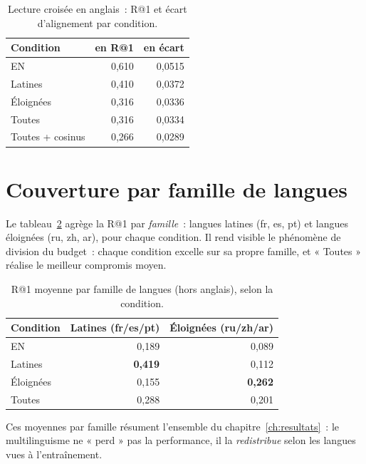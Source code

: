 \documentclass[12pt,a4paper,oneside]{report}
\theoremstyle{definition}
\theoremstyle{plain}
\begin{document}
\begin{table}[ht]
\centering
\caption{Lecture croisée en anglais~: R@1 et écart d'alignement par condition.}
\label{tab:cross}
\small
\begin{tabular}{@{}lrr@{}}
\toprule
Condition & en R@1 & en écart \\
\midrule
EN        & 0,610 & 0,0515 \\
Latines   & 0,410 & 0,0372 \\
Éloignées & 0,316 & 0,0336 \\
Toutes    & 0,316 & 0,0334 \\
Toutes + cosinus & 0,266 & 0,0289 \\
\bottomrule
\end{tabular}
\end{table}

\section{Couverture par famille de langues}

Le tableau~\ref{tab:couverture} agrège la R@1 par \emph{famille}~: langues latines
(fr, es, pt) et langues éloignées (ru, zh, ar), pour chaque condition. Il rend
visible le phénomène de division du budget~: chaque condition excelle sur sa propre
famille, et « Toutes » réalise le meilleur compromis moyen.

\begin{table}[ht]
\centering
\caption{R@1 moyenne par famille de langues (hors anglais), selon la condition.}
\label{tab:couverture}
\small
\begin{tabular}{@{}lrr@{}}
\toprule
Condition & Latines (fr/es/pt) & Éloignées (ru/zh/ar) \\
\midrule
EN        & 0,189 & 0,089 \\
Latines   & \textbf{0,419} & 0,112 \\
Éloignées & 0,155 & \textbf{0,262} \\
Toutes    & 0,288 & 0,201 \\
\bottomrule
\end{tabular}
\end{table}

Ces moyennes par famille résument l'ensemble du chapitre~\ref{ch:resultats}~: le
multilinguisme ne « perd » pas la performance, il la \emph{redistribue} selon les
langues vues à l'entraînement.

\end{document}
